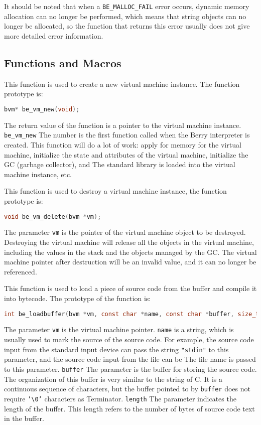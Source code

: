 It should be noted that when a \texttt{BE\_MALLOC\_FAIL} error occurs, dynamic memory allocation can no longer be performed, which means that string objects can no longer be allocated, so the function that returns this error usually does not give more detailed error information.

\subsection {Functions and Macros}


This function is used to create a new virtual machine instance. The function prototype is:
\begin{lstlisting}[language=c, style=berry, numbers=none]
bvm* be_vm_new(void);
\end{lstlisting}
The return value of the function is a pointer to the virtual machine instance. \texttt{{be\_vm\_new}} The number is the first function called when the Berry interpreter is created. This function will do a lot of work: apply for memory for the virtual machine, initialize the state and attributes of the virtual machine, initialize the GC (garbage collector), and The standard library is loaded into the virtual machine instance, etc.

This function is used to destroy a virtual machine instance, the function prototype is:
\begin{lstlisting}[language=c, style=berry, numbers=none]
void be_vm_delete(bvm *vm);
\end{lstlisting}
The parameter \texttt{vm} is the pointer of the virtual machine object to be destroyed. Destroying the virtual machine will release all the objects in the virtual machine, including the values   in the stack and the objects managed by the GC. The virtual machine pointer after destruction will be an invalid value, and it can no longer be referenced.


This function is used to load a piece of source code from the buffer and compile it into bytecode. The prototype of the function is:
\begin{lstlisting}[language=c, style=berry, numbers=none]
int be_loadbuffer(bvm *vm, const char *name, const char *buffer, size_t length);
\end{lstlisting}
The parameter \texttt{vm} is the virtual machine pointer. \texttt{name} is a string, which is usually used to mark the source of the source code. For example, the source code input from the standard input device can pass the string \texttt{"stdin"} to this parameter, and the source code input from the file can be The file name is passed to this parameter. \texttt{buffer} The parameter is the buffer for storing the source code. The organization of this buffer is very similar to the string of C. It is a continuous sequence of characters, but the buffer pointed to by \texttt{buffer} does not require \texttt{'\textbackslash 0'} characters as Terminator. \texttt{length} The parameter indicates the length of the buffer. This length refers to the number of bytes of source code text in the buffer.

